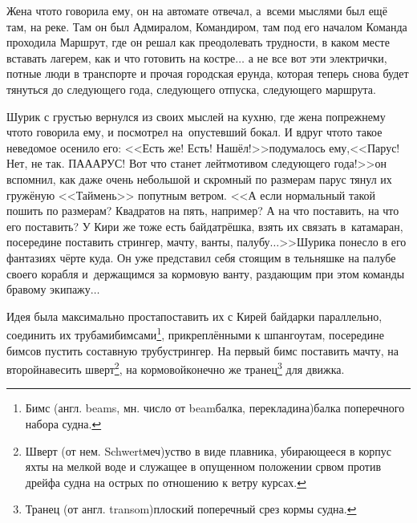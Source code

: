 {Жена что\sdash то говорила ему, он на автомате отвечал, а~всеми мыслями был ещё там, на реке. Там он был Адмиралом, Командиром, там под его началом Команда проходила Маршрут, где он решал как преодолевать трудности, в каком месте вставать лагерем, как и что готовить на костре$\ldots$ а не все вот эти электрички, потные люди в транспорте и прочая городская ерунда, которая теперь снова будет тянуться до следующего года, следующего отпуска, следующего маршрута.

Шурик с грустью вернулся из своих мыслей на кухню, где жена по\sdash прежнему что\sdash то говорила ему, и посмотрел на~опустевший бокал. И вдруг что\sdash то такое неведомое осенило его: <<Есть же! Есть! Нашёл!>>\mdash подумалось ему,\mdash <<Парус! Нет, не так. ПА\sdash А\sdash АРУС! Вот что станет лейтмотивом следующего года!>>\mdash он вспомнил, как даже очень небольшой и скромный по размерам парус тянул их гружёную <<Таймень>> попутным ветром. <<А если нормальный такой пошить по размерам? Квадратов на пять, например? А на что поставить, на что его поставить? У Кири же тоже есть байда\sdash трёшка, взять их связать в~катамаран, посередине поставить стрингер, мачту, ванты, палубу$\ldots$>>\mdash Шурика понесло в его фантазиях чёрте куда. Он уже представил себя стоящим в тельняшке на палубе своего корабля и~держащимся за кормовую ванту, раздающим при этом команды бравому экипажу$\ldots$

\renewcommand*{\thefootnote}{\arabic{footnote}}
\setcounter{footnote}{0}

Идея была максимально проста\mdash поставить их с Кирей байдарки параллельно, соединить их трубами\sdash бимсами\footnote{Бимс (англ. beams, мн. число от beam\mdash балка, перекладина)\mdash балка поперечного набора судна\cite{МорскойСправочник}.}, прикреплёнными к шпангоутам, посередине бимсов пустить составную трубу\sdash стрингер. На первый бимс поставить мачту, на второй\mdash навесить шверт\footnote{Шверт (от нем. Schwert\mdash меч)\mdash уст\sdash во в виде плавника, убирающееся в корпус яхты на мелкой воде и служащее в опущенном положении ср\sdash вом против дрейфа судна на острых по отношению к ветру курсах\cite{МорскойСправочник}.}, на кормовой\mdash конечно же транец\footnote{Транец (от англ. transom)\mdash плоский поперечный срез кормы судна\cite{МорскойСправочник}.} для движка.

\renewcommand*{\thefootnote}{\arabic{footnote}}
\setcounter{footnote}{0}

}
